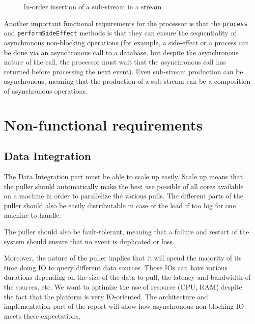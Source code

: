 \begin{figure}[h]
  \begin{center} 
    \caption{In-order insertion of a sub-stream in a stream}
    \label{fig:substream}
  \end{center}
\end{figure}

Another important functional requirements for the processor is that the \verb|process| and \verb|performSideEffect| methods is that they can ensure the
sequentiality of asynchronous non-blocking operations (for example, a side-effect or a process can be done via an asynchronous call to a 
database, but despite the asynchronous nature of the call, the processor must wait that the asynchronous call has returned
before processing the next event). Even sub-stream production can be asynchronous, meaning that the production of a sub-stream
can be a composition of asynchronous operations.


\section{Non-functional requirements}

\subsection{Data Integration}

The Data Integration part must be able to scale up easily. Scale up means that the puller should automatically make the best
use possible of all cores available on a machine in order to parallelize the various pulls. The different parts of the puller 
should also be easily distributable in case of the load if too big for one machine to handle. 

The puller should also be fault-tolerant, meaning that a failure and restart of the system should ensure that no event
is duplicated or loss.

Moreover, the nature of the puller implies that it will spend the majority of its time doing IO to query different data sources.
Those IOs can have various durations depending on the size of the data to pull, the latency and bandwidth of the sources, etc.
We want to optimize the use of resource (CPU, RAM) despite the fact that the platform is very IO-oriented. The architecture and implementation part
of the report will show how asynchronous non-blocking IO meets these expectations.


